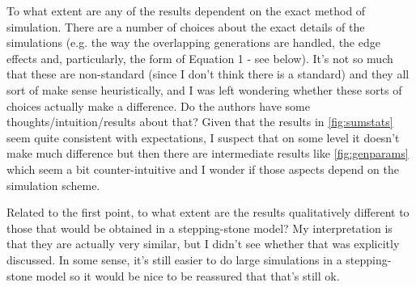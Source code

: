 \begin{point}{}
    To what extent are any of the results dependent on the exact method of simulation. There are a number of choices about the exact details of the simulations (e.g. the way the overlapping generations are handled, the edge effects and, particularly, the form of Equation 1 - see below). It's not so much that these are non-standard (since I don't think there is a standard) and they all sort of make sense heuristically, and I was left wondering whether these sorts of choices actually make a difference. Do the authors have some thoughts/intuition/results about that? Given that the results in \autoref{fig:sumstats} seem quite consistent with expectations, I suspect that on some level it doesn't make much difference but then there are intermediate results like \autoref{fig:genparams} which seem a bit counter-intuitive and I wonder if those aspects depend on the simulation scheme.
\end{point}


\begin{point}{}
    Related to the first point, to what extent are the results qualitatively different to those that would be obtained in a stepping-stone model? My interpretation is that they are actually very similar, but I didn't see whether that was explicitly discussed. In some sense, it's still easier to do large simulations in a stepping-stone model so it would be nice to be reassured that that's still ok.
\end{point}



